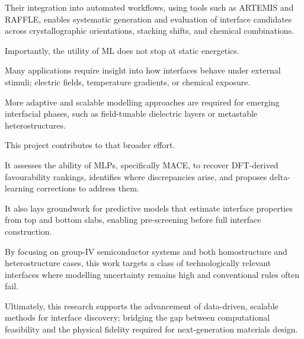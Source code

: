 Their integration into automated workflows, using tools such as ARTEMIS and RAFFLE, enables systematic generation and
evaluation of interface candidates across crystallographic orientations, stacking shifts, and chemical combinations.

\label{para:ml_interface_dynamics} %

Importantly, the utility of ML does not stop at static energetics.

Many applications require insight into how interfaces behave under external stimuli; electric fields, temperature
gradients, or chemical exposure.

More adaptive and scalable modelling approaches are required for emerging interfacial phases, such as field-tunable
dielectric layers or metastable heterostructures.

\label{para:project_contributions} %

This project contributes to that broader effort.

It assesses the ability of MLPs, specifically MACE, to recover DFT-derived favourability rankings, identifies where
discrepancies arise, and proposes delta-learning corrections to address them.

It also lays groundwork for predictive models that estimate interface properties from top and bottom slabs, enabling
pre-screening before full interface construction.

By focusing on group-IV semiconductor systems and both homostructure and heterostructure cases, this work targets a
class of technologically relevant interfaces where modelling uncertainty remains high and conventional rules often fail.

\label{para:advancing_interface_discovery} %

Ultimately, this research supports the advancement of data-driven, scalable methods for interface discovery; bridging
the gap between computational feasibility and the physical fidelity required for next-generation materials design.

